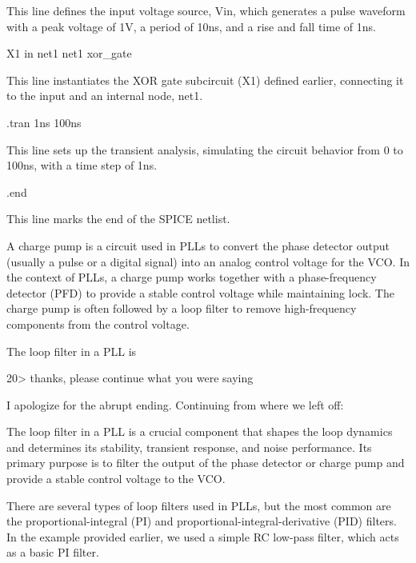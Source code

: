 \documentclass[
]{article}
\newenvironment{Shaded}{}{}
\newcommand{\NormalTok}[1]{#1}
\begin{document}
This line defines the input voltage source, Vin, which generates a pulse
waveform with a peak voltage of 1V, a period of 10ns, and a rise and
fall time of 1ns.

\begin{Shaded}
\begin{Highlighting}[]
\NormalTok{X1 in net1 net1 xor\_gate}
\end{Highlighting}
\end{Shaded}

This line instantiates the XOR gate subcircuit (X1) defined earlier,
connecting it to the input and an internal node, net1.

\begin{Shaded}
\begin{Highlighting}[]
\NormalTok{.tran 1ns 100ns}
\end{Highlighting}
\end{Shaded}

This line sets up the transient analysis, simulating the circuit
behavior from 0 to 100ns, with a time step of 1ns.

\begin{Shaded}
\begin{Highlighting}[]
\NormalTok{.end}
\end{Highlighting}
\end{Shaded}

This line marks the end of the SPICE netlist.

A charge pump is a circuit used in PLLs to convert the phase detector
output (usually a pulse or a digital signal) into an analog control
voltage for the VCO. In the context of PLLs, a charge pump works
together with a phase-frequency detector (PFD) to provide a stable
control voltage while maintaining lock. The charge pump is often
followed by a loop filter to remove high-frequency components from the
control voltage.

The loop filter in a PLL is

20\textgreater{} thanks, please continue what you were saying

I apologize for the abrupt ending. Continuing from where we left off:

The loop filter in a PLL is a crucial component that shapes the loop
dynamics and determines its stability, transient response, and noise
performance. Its primary purpose is to filter the output of the phase
detector or charge pump and provide a stable control voltage to the VCO.

There are several types of loop filters used in PLLs, but the most
common are the proportional-integral (PI) and
proportional-integral-derivative (PID) filters. In the example provided
earlier, we used a simple RC low-pass filter, which acts as a basic PI
filter.
\end{document}
